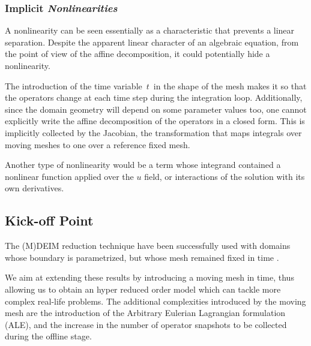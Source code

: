 

\subsubsection{Implicit \textit{Nonlinearities}}
A nonlinearity can be seen essentially as a characteristic that prevents a linear separation.
Despite the apparent linear character of an algebraic equation, 
from the point of view of the affine decomposition, 
it could potentially hide a nonlinearity.

The introduction of the time variable~$t$~in the shape of the mesh makes it so
that the operators change at each time step during the integration loop.
Additionally, since the domain geometry will depend on some parameter values too, 
one cannot explicitly write the affine decomposition of the operators in a closed form.
This is implicitly collected by the Jacobian,
the transformation that maps integrals over moving meshes 
to one over a reference fixed mesh.

Another type of nonlinearity would be a term whose integrand contained 
a nonlinear function applied over the $u$ field,
or interactions of the solution with its own derivatives.

\subsection{Kick-off Point}
The (M)DEIM reduction technique have been successfully used with domains
whose boundary is parametrized, but whose mesh remained fixed in time \cite{Santo_Manzoni_2019}. 

We aim at extending these results by introducing a moving mesh in time,
thus allowing us to obtain an hyper reduced order model which can tackle 
more complex \mbox{real-life} problems.
The additional complexities introduced by the moving mesh are the introduction 
of the Arbitrary Eulerian Lagrangian formulation (ALE), 
and the increase in the number of operator snapshots to be collected during the offline stage.  

